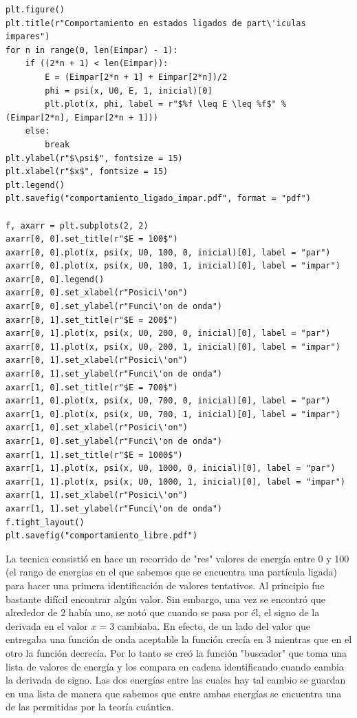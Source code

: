 \documentclass{article}
\begin{document}
\begin{lstlisting}[breaklines = true]
plt.figure()
plt.title(r"Comportamiento en estados ligados de part\'iculas impares")
for n in range(0, len(Eimpar) - 1):
	if ((2*n + 1) < len(Eimpar)):
		E = (Eimpar[2*n + 1] + Eimpar[2*n])/2
		phi = psi(x, U0, E, 1, inicial)[0]
		plt.plot(x, phi, label = r"$%f \leq E \leq %f$" % (Eimpar[2*n], Eimpar[2*n + 1]))
	else:
		break
plt.ylabel(r"$\psi$", fontsize = 15)
plt.xlabel(r"$x$", fontsize = 15)
plt.legend()
plt.savefig("comportamiento_ligado_impar.pdf", format = "pdf") 

f, axarr = plt.subplots(2, 2)
axarr[0, 0].set_title(r"$E = 100$")
axarr[0, 0].plot(x, psi(x, U0, 100, 0, inicial)[0], label = "par")
axarr[0, 0].plot(x, psi(x, U0, 100, 1, inicial)[0], label = "impar")
axarr[0, 0].legend()
axarr[0, 0].set_xlabel(r"Posici\'on")
axarr[0, 0].set_ylabel(r"Funci\'on de onda")
axarr[0, 1].set_title(r"$E = 200$")
axarr[0, 1].plot(x, psi(x, U0, 200, 0, inicial)[0], label = "par")
axarr[0, 1].plot(x, psi(x, U0, 200, 1, inicial)[0], label = "impar")
axarr[0, 1].set_xlabel(r"Posici\'on")
axarr[0, 1].set_ylabel(r"Funci\'on de onda")
axarr[1, 0].set_title(r"$E = 700$")
axarr[1, 0].plot(x, psi(x, U0, 700, 0, inicial)[0], label = "par")
axarr[1, 0].plot(x, psi(x, U0, 700, 1, inicial)[0], label = "impar")
axarr[1, 0].set_xlabel(r"Posici\'on")
axarr[1, 0].set_ylabel(r"Funci\'on de onda")
axarr[1, 1].set_title(r"$E = 1000$")
axarr[1, 1].plot(x, psi(x, U0, 1000, 0, inicial)[0], label = "par")
axarr[1, 1].plot(x, psi(x, U0, 1000, 1, inicial)[0], label = "impar")
axarr[1, 1].set_xlabel(r"Posici\'on")
axarr[1, 1].set_ylabel(r"Funci\'on de onda")
f.tight_layout()
plt.savefig("comportamiento_libre.pdf")

\end{lstlisting}

La tecnica consisti\'o en hace un recorrido de "res" valores de energ\'ia entre 0 y 100 (el rango de energias en el que sabemos que se encuentra una part\'icula ligada) para hacer una primera identificaci\'on de valores tentativos. Al principio fue bastante dif\'icil encontrar alg\'un valor. Sin embargo, una vez se encontr\'o que alrededor de 2 hab\'ia uno, se not\'o que cuando se pasa por \'el, el signo de la derivada en el valor $x=3$ cambiaba. En efecto, de un lado del valor que entregaba una funci\'on de onda aceptable la funci\'on crec\'ia en 3 mientras que en el otro la funci\'on decrec\'ia. Por lo tanto se cre\'o la funci\'on "buscador" que toma una lista de valores de energ\'ia y los compara en cadena identificando cuando cambia la derivada de signo. Las dos energ\'ias entre las cuales hay tal cambio se guardan en una lista de manera que sabemos que entre ambas energ\'ias se encuentra una de las permitidas por la teor\'ia cu\'antica.
\end{document}
